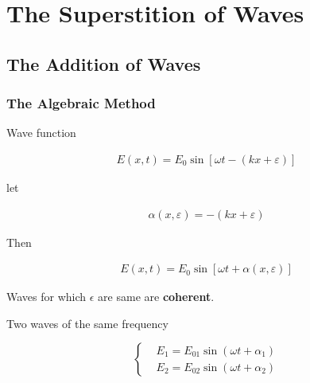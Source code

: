 \chapter{The Superstition of Waves}

\section{The Addition of Waves}

\subsection{The Algebraic Method}

Wave function

\begin{equation*}
  \begin{aligned}
    E \left( x, t \right) = E_0 \sin \left[ \omega t - \left( k x + \varepsilon \right) \right]
  \end{aligned}
\end{equation*}

let

\begin{equation*}
  \begin{aligned}
    \alpha \left( x , \varepsilon \right) = - \left( k x + \varepsilon \right)
  \end{aligned}
\end{equation*}

Then

\begin{equation*}
  \begin{aligned}
    E \left( x , t \right) = E_0 \sin \left[ \omega t + \alpha \left( x , \varepsilon \right) \right]
  \end{aligned}
\end{equation*}

Waves for which $\epsilon$ are same are \textbf{coherent}.

Two waves of the same frequency

\begin{equation*}
  \left\{
    \begin{aligned}
      & E_1 = E_{01} \sin \left( \omega t + \alpha_1 \right) \\
      & E_2 = E_{02} \sin \left( \omega t + \alpha_2 \right) 
    \end{aligned}
  \right.
\end{equation*}

